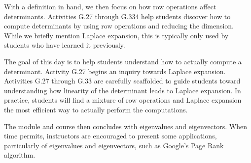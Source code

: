 \documentclass{article}
\begin{document}
With a definition in hand, we then focus on how row operations affect determinants. Activities G.27 through G.334 help students discover how to compute determinants by using row operations and reducing the dimension. While we briefly mention Laplace expansion, this is typically only used by students who have learned it previously.


The goal of this day is to help students understand how to actually compute a determinant.   Activity G.27 begins an inquiry towards Laplace expansion.  Activities G.27 through G.33 are carefully scaffolded to guide students toward understanding how linearity of the determinant leads to Laplace expansion.  In practice, students will find a mixture of row operations and Laplace expansion the most efficient way to actually perform the computations.

The module and course then concludes with eigenvalues and eigenvectors. When time permits, instructors are encouraged to present some applications, particularly of eigenvalues and eigenvectors, such as Google's Page Rank algorithm.
\end{document}
